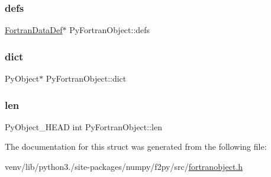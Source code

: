\subsubsection{\texorpdfstring{defs}{defs}}
{\footnotesize\ttfamily \hyperlink{structFortranDataDef}{Fortran\+Data\+Def}$\ast$ Py\+Fortran\+Object\+::defs}

\mbox{\label{structPyFortranObject_a8e589a13bed1070f68f8094e91a54bec}} 
\subsubsection{\texorpdfstring{dict}{dict}}
{\footnotesize\ttfamily Py\+Object$\ast$ Py\+Fortran\+Object\+::dict}

\mbox{\label{structPyFortranObject_aa31e81b5bef7f570614b69f5deb05032}} 
\subsubsection{\texorpdfstring{len}{len}}
{\footnotesize\ttfamily Py\+Object\+\_\+\+H\+E\+AD int Py\+Fortran\+Object\+::len}



The documentation for this struct was generated from the following file\+:\begin{DoxyCompactItemize}
\item 
venv/lib/python3./site-\/packages/numpy/f2py/src/\hyperlink{fortranobject_8h}{fortranobject.\+h}\end{DoxyCompactItemize}
